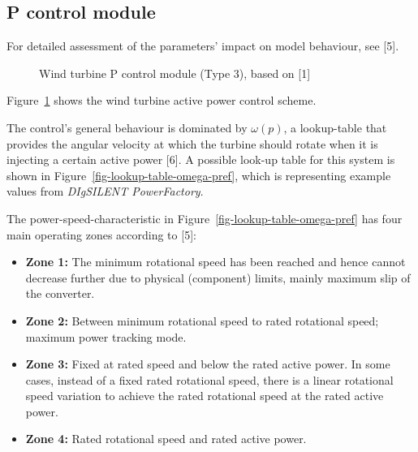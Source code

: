 \documentclass[
  a4paper,
  DIV=11,
  numbers=noendperiod]{scrartcl}
\providecommand{\tightlist}{%
  \setlength{\itemsep}{0pt}\setlength{\parskip}{0pt}}\usepackage{longtable,booktabs,array}
\begin{document}
\subsection{P control module}\label{sec-wt-p-control}

For detailed assessment of the parameters' impact on model behaviour,
see {[}5{]}.

\begin{figure}


\caption{\label{fig-wtPControl}Wind turbine P control module (Type 3),
based on {[}1{]}}

\end{figure}%

Figure~\ref{fig-wtPControl} shows the wind turbine active power control
scheme.

The control's general behaviour is dominated by \(\omega(p)\), a
lookup-table that provides the angular velocity at which the turbine
should rotate when it is injecting a certain active power {[}6{]}. A
possible look-up table for this system is shown in
Figure~\ref{fig-lookup-table-omega-pref}, which is representing example
values from \emph{DIgSILENT PowerFactory}.

The power-speed-characteristic in
Figure~\ref{fig-lookup-table-omega-pref} has four main operating zones
according to {[}5{]}:

\begin{itemize}
\tightlist
\item
  \textbf{Zone 1:} The minimum rotational speed has been reached and
  hence cannot decrease further due to physical (component) limits,
  mainly maximum slip of the converter.
\item
  \textbf{Zone 2:} Between minimum rotational speed to rated rotational
  speed; maximum power tracking mode.
\item
  \textbf{Zone 3:} Fixed at rated speed and below the rated active
  power. In some cases, instead of a fixed rated rotational speed, there
  is a linear rotational speed variation to achieve the rated rotational
  speed at the rated active power.
\item
  \textbf{Zone 4:} Rated rotational speed and rated active power.
\end{itemize}
\end{document}
